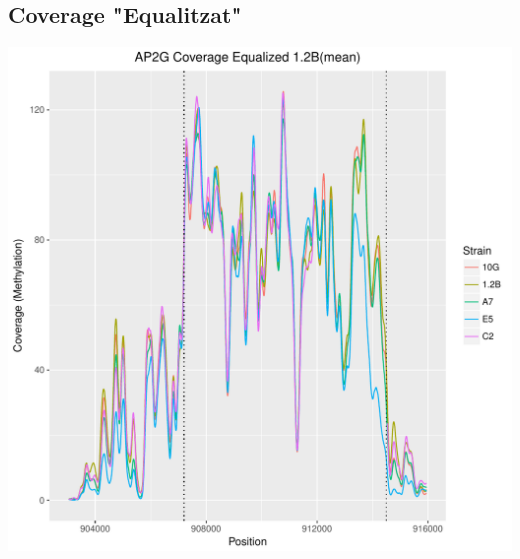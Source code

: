 \documentclass{article}\usepackage[]{graphicx}\usepackage[]{color}
\newenvironment{knitrout}{}{} %
\begin{document}
\subsection{Coverage "Equalitzat"}
\begin{knitrout}
\color{fgcolor}
\includegraphics[width=1\linewidth]{figure/plot_equalizedCov-1} 

\end{knitrout}
\clearpage
\end{document}
